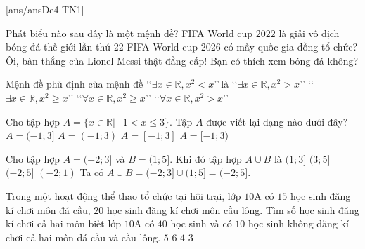 ﻿\begin{name}
	{\tenchude}
	{\tendethi}
	{\tentruong}
	{\thoigian}
\end{name}
\TN
\setcounter{ex}{0}\setcounter{bt}{0}
[ans/ansDe4-TN1]
\begin{ex}%
Phát biểu nào sau đây là một mệnh đề?
\choice
{\True FIFA World cup $2022$ là giải vô địch bóng đá thế giới lần thứ $22$}
{FIFA World cup $2026$ có mấy quốc gia đồng tổ chức?}
{Ôi, bàn thắng của Lionel Messi thật đẳng cấp!}
{Bạn có thích xem bóng đá không?}
\loigiai{
}
\end{ex}

\begin{ex}%
Mệnh đề phủ định của mệnh đề \lq\lq$\exists x \in \mathbb{R}, x^2<x$\rq\rq\,là
\choice
{\lq\lq$\exists x \in \mathbb{R}, x^2>x$\rq\rq}
{\lq\lq$\exists x \in \mathbb{R}, x^2 \geq x$\rq\rq}
{\True \lq\lq$\forall x \in \mathbb{R}, x^2 \geq x$\rq\rq}
{\lq\lq$\forall x \in \mathbb{R}, x^2>x$\rq\rq}
\end{ex}

\begin{ex}%
Cho tập hợp $A=\{x\in \mathbb{R}|-1<x\le 3\}$. Tập $A$ được viết lại dạng nào dưới đây?
\choice
{\True $A=(-1;3]$}
{$A=(-1;3)$}
{$A=[-1;3]$}
{$A=[-1;3)$}
\loigiai{
Tập $A$ được viết lại là	$A=(-1;3]$.
}
\end{ex}

\begin{ex}%
Cho tập hợp $A=(-2; 3]$ và $B=(1; 5]$. Khi đó tập hợp $A \cup B$ là
\choice
{$(1; 3]$}
{$(3; 5]$}
{\True $(-2; 5]$}
{$(-2; 1)$}
\loigiai
{Ta có $A \cup B = (-2;3] \cup (1;5] = (-2;5]$.}
\end{ex}

\begin{ex}%
Trong một hoạt động thể thao tổ chức tại hội trại, lớp $10$A có $15$ học sinh đăng kí chơi môn đá cầu, $20$ học sinh đăng kí chơi môn cầu lông. Tìm số học sinh đăng kí chơi cả hai môn biết lớp $10$A có $40$ học sinh và có $10$ học sinh không đăng kí chơi cả hai môn đá cầu và cầu lông.
\choice
{\True $5$}
{$6$}
{$4$}
{$3$}
\end{ex}

